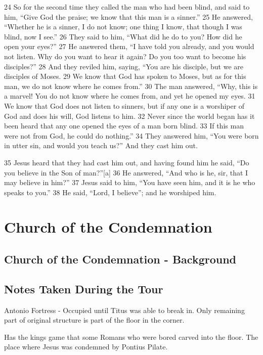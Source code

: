 \documentclass[letterpaper]{report}
\begin{document}
\begin{multicols}{2}
24 So for the second time they called the man who had been blind, and said to him, “Give God the praise; we know that this man is a sinner.” 25 He answered, “Whether he is a sinner, I do not know; one thing I know, that though I was blind, now I see.” 26 They said to him, “What did he do to you? How did he open your eyes?” 27 He answered them, “I have told you already, and you would not listen. Why do you want to hear it again? Do you too want to become his disciples?” 28 And they reviled him, saying, “You are his disciple, but we are disciples of Moses. 29 We know that God has spoken to Moses, but as for this man, we do not know where he comes from.” 30 The man answered, “Why, this is a marvel! You do not know where he comes from, and yet he opened my eyes. 31 We know that God does not listen to sinners, but if any one is a worshiper of God and does his will, God listens to him. 32 Never since the world began has it been heard that any one opened the eyes of a man born blind. 33 If this man were not from God, he could do nothing.” 34 They answered him, “You were born in utter sin, and would you teach us?” And they cast him out.

35 Jesus heard that they had cast him out, and having found him he said, “Do you believe in the Son of man?”[a] 36 He answered, “And who is he, sir, that I may believe in him?” 37 Jesus said to him, “You have seen him, and it is he who speaks to you.” 38 He said, “Lord, I believe”; and he worshiped him.
\end{multicols}

\clearpage
\section{Church of the Condemnation}
\begin{multicols}{2}
\subsection{Church of the Condemnation - Background}

\subsection{Notes Taken During the Tour}
Antonio Fortress - Occupied until Titus was able to break in. Only remaining part of original structure is part of the floor in the corner.

Has the kings game that some Romans who were bored carved into the floor.
The place where Jesus was condemned by Pontius Pilate.
\end{multicols}
\end{document}

